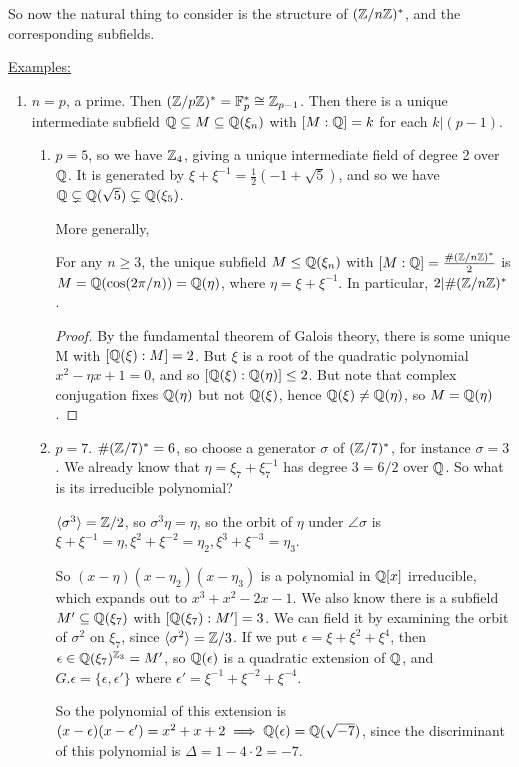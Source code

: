 \documentclass[10pt,a4paper]{article}
\begin{document}
So now the natural thing to consider is the structure of $(\mathbb{Z}/n\mathbb{Z})^{\ast}$, and the corresponding subfields.

\underline{Examples:}
\begin{enumerate}
\item $n=p$, a prime. Then $(\mathbb{Z}/p\mathbb{Z})^{\ast} = \mathbb{F}_p^{\ast} \cong \mathbb{Z}_{p-1}$. Then there is a unique intermediate subfield $\mathbb{Q} \subseteq M \subseteq \mathbb{Q}(\xi_n)$ with $[M:\mathbb{Q}] = k$ for each $k|(p-1)$.
\begin{enumerate}
\item $p=5$, so we have $\mathbb{Z}_4$, giving a unique intermediate field of degree 2 over $\mathbb{Q}$. It is generated by $\xi+\xi^{-1} = \frac{1}{2}(-1+\sqrt{5})$, and so we have $\mathbb{Q} \subsetneq \mathbb{Q}(\sqrt{5})\subsetneq \mathbb{Q}(\xi_5)$.

More generally,
\begin{lemma}
For any $n \geq 3$, the unique subfield $M \leq \mathbb{Q}(\xi_n)$ with $[M:\mathbb{Q}] = \frac{\#(\mathbb{Z}/n\mathbb{Z})^{\ast}}{2}$ is $M = \mathbb{Q}(\cos(2\pi/n)) = \mathbb{Q}(\eta)$, where $\eta  = \xi+\xi^{-1}$. In particular, $2 | \#(\mathbb{Z}/n\mathbb{Z})^{\ast}$.
\end{lemma}
\begin{proof}
By the fundamental theorem of Galois theory, there is some unique M with $[\mathbb{Q}(\xi):M] = 2$. But $\xi$ is a root of the quadratic polynomial $x^2-\eta x+1 = 0$, and so $[\mathbb{Q}(\xi):\mathbb{Q}(\eta)] \leq 2$. But note that complex conjugation fixes $\mathbb{Q}(\eta)$ but not $\mathbb{Q}(\xi)$, hence $\mathbb{Q}(\xi)\neq \mathbb{Q}(\eta)$, so $M = \mathbb{Q}(\eta)$.
\end{proof}
\item $p=7$. $\#(\mathbb{Z}/7)^{\ast} = 6$, so choose a generator $\sigma$ of $(\mathbb{Z}/7)^{\ast}$, for instance $\sigma = 3$. We already know that $\eta = \xi_7+\xi_7^{-1}$ has degree $3=6/2$ over $\mathbb{Q}$. So what is its irreducible polynomial?

$\langle \sigma^3 \rangle = \mathbb{Z}/2$, so $\sigma^3\eta = \eta$, so the orbit of $\eta$ under $\angle{\sigma}$ is $\xi+\xi^{-1} = \eta, \xi^2 + \xi^{-2} = \eta_2, \xi^3+\xi^{-3} = \eta_3$.

So $(x-\eta)(x-\eta_2)(x-\eta_3)$ is a polynomial in $\mathbb{Q}[x]$ irreducible, which expands out to $x^3+x^2-2x-1$. We also know there is a subfield $M'\subseteq \mathbb{Q}(\xi_7)$ with $[\mathbb{Q}(\xi_7):M'] = 3$. We can field it by examining the orbit of $\sigma^2$ on $\xi_7$, since $\langle \sigma^2 \rangle = \mathbb{Z}/3$. If we put $\epsilon = \xi + \xi^2 + \xi^4$, then $\epsilon \in \mathbb{Q}(\xi_7)^{\mathbb{Z}_3} = M'$, so $\mathbb{Q}(\epsilon)$ is a quadratic extension of $\mathbb{Q}$, and $G.\epsilon = \{\epsilon, \epsilon'\}$ where $\epsilon' = \xi^{-1} + \xi^{-2} + \xi^{-4}$.

So the polynomial of this extension is $(x-\epsilon)(x-\epsilon') = x^2+x+2 \implies \mathbb{Q}(\epsilon) = \mathbb{Q}(\sqrt{-7})$, since the discriminant of this polynomial is $\Delta = 1-4\cdot 2 = -7$.
\end{enumerate}
\end{enumerate}
\end{document}
